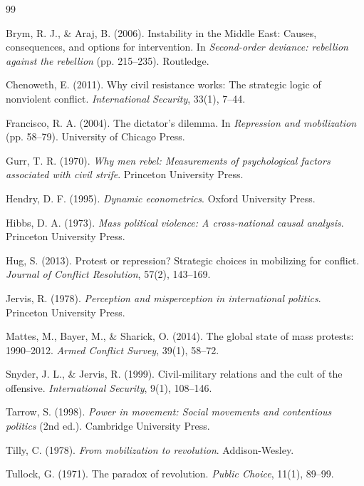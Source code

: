\documentclass[11pt,a4paper]{article}
\begin{document}
\begin{thebibliography}{99}

 Brym, R. J., \& Araj, B. (2006). Instability in the Middle East: Causes, consequences, and options for intervention. In \textit{Second-order deviance: rebellion against the rebellion} (pp. 215--235). Routledge.

 Chenoweth, E. (2011). Why civil resistance works: The strategic logic of nonviolent conflict. \textit{International Security}, 33(1), 7--44.

 Francisco, R. A. (2004). The dictator's dilemma. In \textit{Repression and mobilization} (pp. 58--79). University of Chicago Press.

 Gurr, T. R. (1970). \textit{Why men rebel: Measurements of psychological factors associated with civil strife}. Princeton University Press.

 Hendry, D. F. (1995). \textit{Dynamic econometrics}. Oxford University Press.

 Hibbs, D. A. (1973). \textit{Mass political violence: A cross-national causal analysis}. Princeton University Press.

 Hug, S. (2013). Protest or repression? Strategic choices in mobilizing for conflict. \textit{Journal of Conflict Resolution}, 57(2), 143--169.

 Jervis, R. (1978). \textit{Perception and misperception in international politics}. Princeton University Press.

 Mattes, M., Bayer, M., \& Sharick, O. (2014). The global state of mass protests: 1990--2012. \textit{Armed Conflict Survey}, 39(1), 58--72.

 Snyder, J. L., \& Jervis, R. (1999). Civil-military relations and the cult of the offensive. \textit{International Security}, 9(1), 108--146.

 Tarrow, S. (1998). \textit{Power in movement: Social movements and contentious politics} (2nd ed.). Cambridge University Press.

 Tilly, C. (1978). \textit{From mobilization to revolution}. Addison-Wesley.

 Tullock, G. (1971). The paradox of revolution. \textit{Public Choice}, 11(1), 89--99.

\end{thebibliography}
\end{document}
